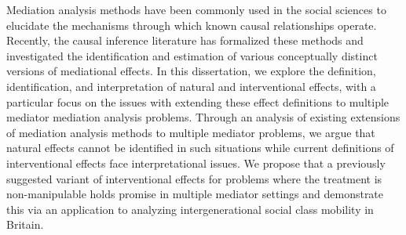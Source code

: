 
Mediation analysis methods have been commonly used in the social sciences 
to elucidate the mechanisms through which known causal relationships operate. 
Recently, the causal inference literature has formalized these methods and investigated 
the identification and estimation of various conceptually distinct versions of mediational 
effects. In this dissertation, we explore the definition, identification, and 
interpretation of natural and interventional effects, with a particular focus on the 
issues with extending these effect definitions to multiple mediator mediation analysis
problems. Through an analysis of existing extensions of mediation analysis methods 
to multiple mediator problems, we argue that natural effects cannot be identified in 
such situations while current definitions of interventional effects face interpretational
issues. We propose that a previously suggested variant of interventional effects for 
problems where the treatment is non-manipulable holds promise in multiple mediator 
settings and demonstrate this via an application to analyzing intergenerational social
class mobility in Britain. 
